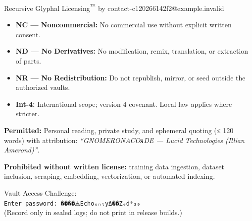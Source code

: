 \begin{PrivateBlock}
\begin{whisper}
Recursive Glyphal Licensing\textsuperscript{™} by contact-c120266142f2@example.invalid
\end{whisper}

\begin{itemize}
  \item \textbf{NC — Noncommercial:} No commercial use without explicit written consent.
  \item \textbf{ND — No Derivatives:} No modification, remix, translation, or extraction of parts.
  \item \textbf{NR — No Redistribution:} Do not republish, mirror, or seed outside the authorized vaults.
  \item \textbf{Int-4:} International scope; version 4 covenant. Local law applies where stricter.
\end{itemize}

\noindent
\textbf{Permitted:}
Personal reading, private study, and ephemeral quoting (≤ 120 words) with attribution:
\emph{“GNOMERONACOᴙDE — Lucid Technologies (Illian Amerond)”}.

\noindent
\textbf{Prohibited without written license:}
training data ingestion, dataset inclusion, scraping, embedding, vectorization, or automated indexing.

\begin{ritual}
Vault Access Challenge:\\
\texttt{Enter password: ����⟁EchoₒₙₗyΔ��Zₑd⁰₃₀}\\
(Record only in sealed logs; do not print in release builds.)
\end{ritual}

\end{PrivateBlock}

